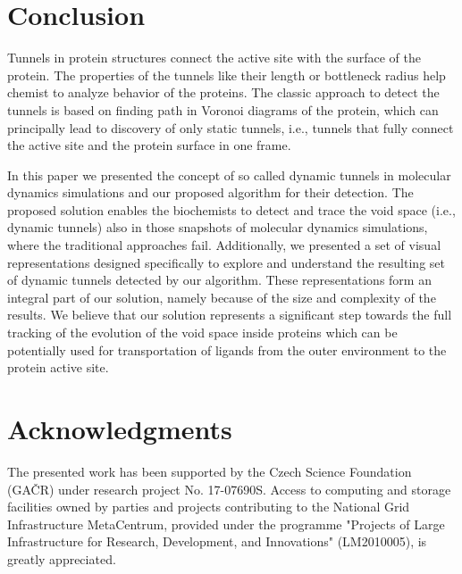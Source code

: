 \documentclass[usletter, 10pt, conference]{svjour3}      %
\begin{document}







\section{Conclusion }

Tunnels in protein structures connect the active site with the surface of the protein.
The properties of the tunnels like their length or bottleneck radius help chemist to analyze behavior of the proteins.
The classic approach to detect the tunnels is based on finding path in Voronoi diagrams of the protein, which can principally
lead to discovery of only static tunnels, i.e., tunnels that fully connect the active site and the protein surface in one frame.

In this paper we presented the concept of so called dynamic tunnels in molecular dynamics simulations and our proposed algorithm for their detection.
The proposed solution enables the biochemists to detect and trace the void space (i.e., dynamic tunnels) also in those snapshots of molecular dynamics simulations, where the traditional approaches fail.
Additionally, we presented a set of visual representations designed specifically to explore and understand the resulting set of dynamic tunnels detected by our algorithm. 
These representations form an integral part of our solution, namely because of the size and complexity of the results. 
We believe that our solution represents a significant step towards the full tracking of the evolution of the void space inside proteins which can be potentially used for transportation of ligands from the outer environment to the protein active site.




\section{Acknowledgments}

The presented work has been supported by the Czech Science Foundation (GA{\v C}R) under research project No. 17-07690S.
Access to computing and storage facilities owned by parties and projects contributing to the National Grid Infrastructure MetaCentrum, provided under the programme "Projects of Large Infrastructure for Research, Development, and Innovations" (LM2010005), is greatly appreciated.




\end{document}
